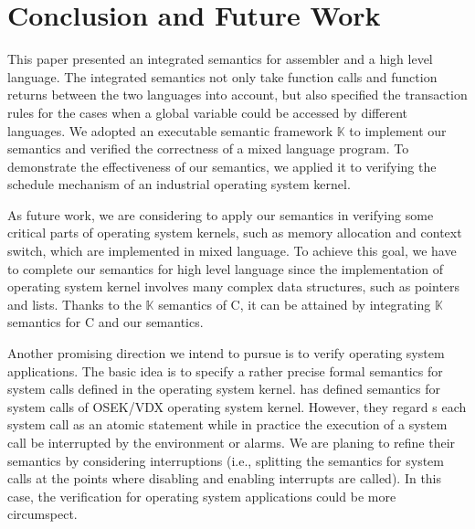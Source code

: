 \documentclass[letterpaper, 10 pt, conference]{IEEEtran}
\begin{document}
\section{Conclusion and Future Work}
\par This paper presented an integrated semantics for assembler and a high level language. The integrated semantics not only take function calls and function returns between the two languages into account, but also specified the transaction rules for the cases when a global variable could be accessed by different languages. We adopted an executable semantic framework $\mathbb{K}$ to implement our semantics and verified the correctness of a mixed language program. To demonstrate the effectiveness of our semantics, we applied it to verifying the schedule mechanism of an industrial operating system kernel.
\par As future work, we are considering to
 apply our semantics in verifying some critical parts of operating system kernels, such as memory allocation and context switch, which are implemented in mixed language. To achieve this goal, we have to complete our semantics for high level language since the implementation of operating system kernel involves many complex data structures, such as pointers and lists. Thanks to the $\mathbb{K}$
semantics of C, it can be attained by integrating $\mathbb{K}$ semantics for C and our semantics.
\par Another promising direction we intend to pursue is to verify operating system applications. The basic idea is to specify a rather precise formal semantics for system calls defined in the operating system kernel. \cite{xiaoran} has defined semantics for system calls of OSEK/VDX operating system kernel. However, they regard s each system call as an atomic statement while
in practice the execution of a system call be interrupted by the environment or alarms. We are planing to refine their semantics by considering interruptions (i.e., splitting the semantics for system calls at the points where disabling and enabling interrupts are called). In this case, the verification for operating system applications could be more circumspect.



\vspace{12pt}
\color{red}
\end{document}

